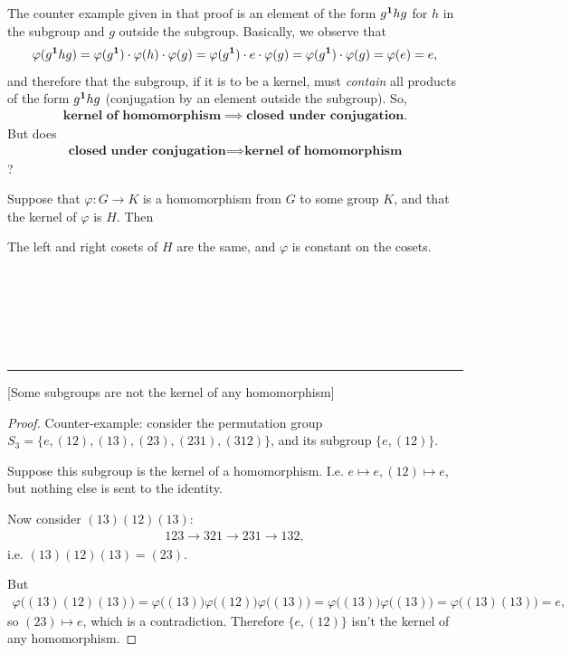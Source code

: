 The counter example given in that proof is an element of the form $g^{\mathbf 1}hg$ for
$h$ in the subgroup and $g$ outside the subgroup. Basically, we observe that
\begin{align*}
\varphi(g^{\mathbf 1}hg) =
\varphi(g^{\mathbf 1})\cdot\varphi(h)\cdot \varphi(g) =
\varphi(g^{\mathbf 1})\cdot e\cdot\varphi(g) =
\varphi(g^{\mathbf 1})\cdot \varphi(g) =
\varphi(e) =
e,
\end{align*}
and therefore that the subgroup, if it is to be a kernel, must \emph{contain}
all products of the form $g^{\mathbf 1}hg$ (conjugation by an element outside the
subgroup). So,
\begin{align*}
  \textbf{kernel of homomorphism} \implies \textbf{closed under conjugation}.
\end{align*}
But does
\begin{align*}
  \textbf{closed under conjugation} \implies \textbf{kernel of homomorphism}
\end{align*}
?

Suppose that $\varphi:G \to K$ is a homomorphism from $G$ to some group $K$,
and that the kernel of $\varphi$ is $H$. Then

\begin{theorem}
  The left and right cosets of $H$ are the same, and $\varphi$ is constant on
  the cosets.
\end{theorem}

~\\~\\~\\~\\~\\
\hrule
\begin{theorem}\label{some-subgroups-not-kernel}
[Some subgroups are not the kernel of any homomorphism]
\end{theorem}

\begin{proof}
Counter-example: consider the permutation group
$S_3 = \{e, (12), (13), (23), (231), (312)\}$, and its subgroup $\{e,
(12)\}$.

Suppose this subgroup is the kernel of a homomorphism. I.e.
$e \mapsto e, (12) \mapsto e$, but nothing else is sent to the identity.

Now consider $(13)(12)(13)$:
\begin{align*}
  123 \to 321 \to 231 \to 132,
\end{align*}
i.e. $(13)(12)(13) = (23)$.

But
\begin{align*}
  \varphi\Big((13)(12)(13)\Big) =
  \varphi\Big((13)\Big) \varphi\Big((12)\Big) \varphi\Big((13)\Big) =
  \varphi\Big((13)\Big) \varphi\Big((13)\Big) = \varphi\Big((13)(13)\Big) = e,
\end{align*}
so $(23) \mapsto e$, which is a contradiction. Therefore $\{e,(12)\}$ isn't the
kernel of any homomorphism.
\end{proof}

